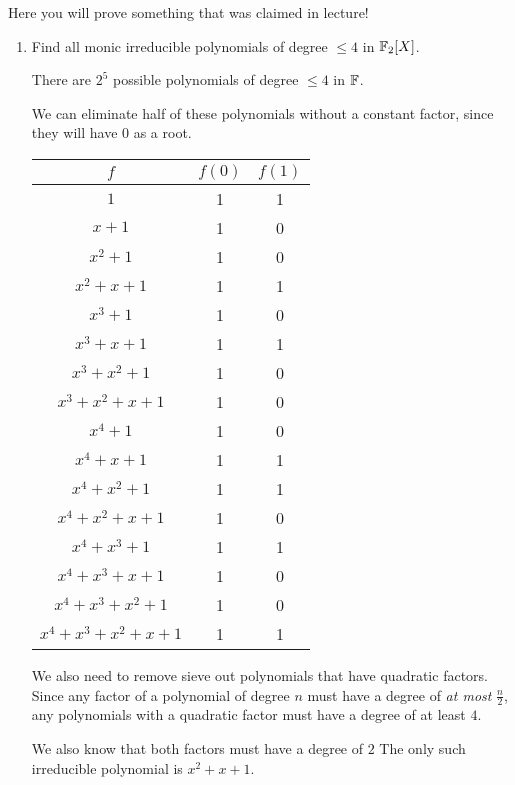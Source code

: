\begin{problem}
Here you will prove something that was claimed in lecture!
\begin{enumerate}\renewcommand{\itemsep}{3mm}
\item Find all monic irreducible polynomials of degree $\leq 4$ in $\mathbb{F}_2[X]$.

\noindent
\begin{Answer}
There are $2^5$ possible polynomials of degree $\leq 4$ in $\mathbb{F}$.

\noindent
We can eliminate half of these polynomials without a
constant factor, since they will have $0$ as a root.

\centering
\begin{tabular}{||c | c | c ||} 
\hline
  $f$                   & $f(0)$  & $f(1)$\\
\hline
  $1$                   & 1       & 1\\
  $x+1$                 & 1       & 0\\
  $x^2+1$               & 1       & 0\\
  $x^2+x+1$             & 1       & 1\\ 
  $x^3+1$               & 1       & 0\\ 
  $x^3+x+1$             & 1       & 1\\ 
  $x^3+x^2+1$           & 1       & 0\\ 
  $x^3+x^2+x+1$         & 1       & 0\\ 
  $x^4+1$               & 1       & 0\\ 
  $x^4+x+1$             & 1       & 1\\ 
  $x^4+x^2+1$           & 1       & 1\\ 
  $x^4+x^2+x+1$         & 1       & 0\\ 
  $x^4+x^3+1$           & 1       & 1\\ 
  $x^4+x^3+x+1$         & 1       & 0\\ 
  $x^4+x^3+x^2+1$       & 1       & 0\\ 
  $x^4+x^3+x^2+x+1$     & 1       & 1\\[1ex]
\hline
\end{tabular}

\flushleft{}
\noindent
We also need to remove sieve out polynomials that have quadratic factors.
Since any factor of a polynomial of degree $n$ must have a degree of \textit{at most} $\frac{n}{2}$,
any polynomials with a quadratic factor must have a degree of at least $4$.

We also know that both factors must have a degree of $2$ The only such irreducible
polynomial is $x^2 + x + 1$.


\end{Answer}
\end{enumerate}
\end{problem}
